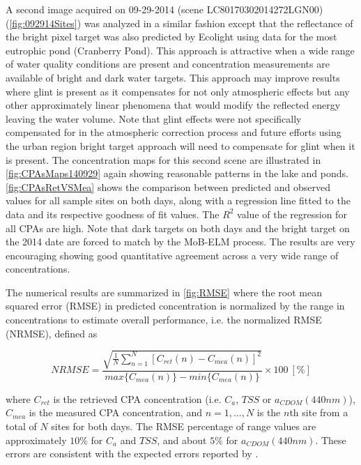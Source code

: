 
A second image acquired on 09-29-2014 (scene LC80170302014272LGN00) (\autoref{fig:092914Sites}) was analyzed in a similar fashion except that the reflectance of the bright pixel target was also predicted by Ecolight using data for the most eutrophic pond (Cranberry Pond). This approach is attractive when a wide range of water quality conditions are present and concentration measurements are available of bright and dark water targets. This approach may improve results where glint is present as it compensates for not only atmospheric effects but any other approximately linear phenomena that would modify the reflected energy leaving the water volume. Note that glint effects were not specifically compensated for in the atmospheric correction process and future efforts using the urban region bright target approach will need to compensate for glint when it is present. The concentration maps for this second scene are illustrated in \autoref{fig:CPAsMaps140929} again showing reasonable patterns in the lake and ponds. \autoref{fig:CPAsRetVSMea} shows the comparison between predicted and observed values for all sample sites on both days, along with a regression line fitted to the data and its respective goodness of fit values. The $R^2$ value of the regression for all CPAs are high. Note that dark targets on both days and the bright target on the 2014 date are forced to match by the MoB-ELM process. The results are very encouraging showing good quantitative agreement across a very wide range of concentrations. 

The numerical results are summarized in \autoref{fig:RMSE} where the root mean squared error (RMSE) in predicted concentration is normalized by the range in concentrations to estimate overall performance, i.e. the normalized RMSE (NRMSE), defined as

\begin{equation}
\label{eq:error_percentage}
  NRMSE =\frac{\sqrt{\frac{1}{N}\sum_{n=1}^N{\left[C_{ret}(n) - C_{mea}(n)\right]^2}}}{max\{C_{mea}(n)\} - min\{C_{mea}(n)\}}\times100 ~[\%]
\end{equation}

\noindent where $C_{ret}$ is the retrieved CPA concentration (i.e. $C_a$, $TSS$ or $a_{CDOM}(440nm)$), $C_{mea}$ is the measured CPA concentration, and $n=1,...,N$ is the $n$th site from a total of $N$ sites for both days. The RMSE percentage of range values are approximately $10\%$ for $C_a$ and $TSS$, and about $5\%$ for $a_{CDOM}(440nm)$. These errors are consistent with the expected errors reported by \cite{Gerace:2013}. 

